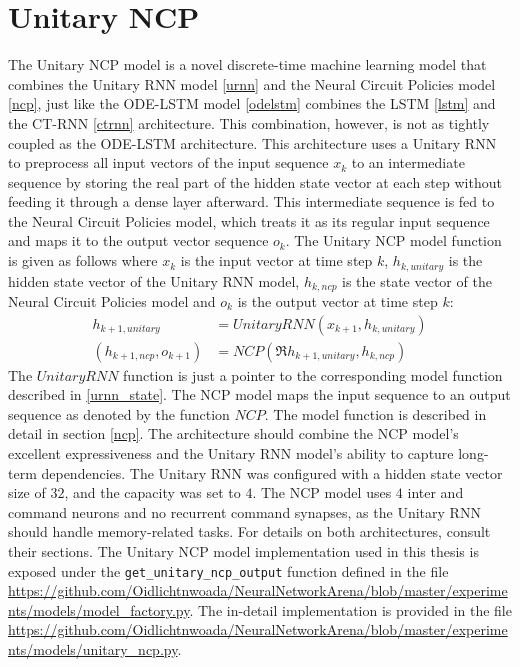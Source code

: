 \documentclass[draft,final]{vutinfth} %
\begin{document}
    \section{Unitary NCP} \label{uncp}
    The Unitary NCP model is a novel discrete-time machine learning model that combines the Unitary RNN model \ref{urnn} and the Neural Circuit Policies model \ref{ncp}, just like the ODE-LSTM model \ref{odelstm} combines the LSTM \ref{lstm} and the CT-RNN \ref{ctrnn} architecture.
    This combination, however, is not as tightly coupled as the ODE-LSTM architecture. 
    This architecture uses a Unitary RNN to preprocess all input vectors of the input sequence $x_k$ to an intermediate sequence by storing the real part of the hidden state vector at each step without feeding it through a dense layer afterward.
    This intermediate sequence is fed to the Neural Circuit Policies model, which treats it as its regular input sequence and maps it to the output vector sequence $o_k$.
    The Unitary NCP model function is given as follows where $x_k$ is the input vector at time step $k$, $h_{k,unitary}$ is the hidden state vector of the Unitary RNN model, $h_{k,ncp}$ is the state vector of the Neural Circuit Policies model and $o_k$ is the output vector at time step $k$:
    \begin{align}
    h_{k+1,unitary} &= UnitaryRNN(x_{k+1}, h_{k,unitary}) \\
    (h_{k+1,ncp}, o_{k+1}) &= NCP(\Re{h_{k+1,unitary}}, h_{k,ncp})
    \end{align}
    The $UnitaryRNN$ function is just a pointer to the corresponding model function described in \ref{urnn_state}.
    The NCP model maps the input sequence to an output sequence as denoted by the function $NCP$. The model function is described in detail in section \ref{ncp}.
    The architecture should combine the NCP model's excellent expressiveness and the Unitary RNN model’s ability to capture long-term dependencies.
    The Unitary RNN was configured with a hidden state vector size of $32$, and the capacity was set to $4$. 
    The NCP model uses $4$ inter and command neurons and no recurrent command synapses, as the Unitary RNN should handle memory-related tasks.
    For details on both architectures, consult their sections.
    The Unitary NCP model implementation used in this thesis is exposed under the \texttt{get\_unitary\_ncp\_output} function defined in the file \url{https://github.com/Oidlichtnwoada/NeuralNetworkArena/blob/master/experiments/models/model_factory.py}.
    The in-detail implementation is provided in the file \url{https://github.com/Oidlichtnwoada/NeuralNetworkArena/blob/master/experiments/models/unitary_ncp.py}.
\end{document}
